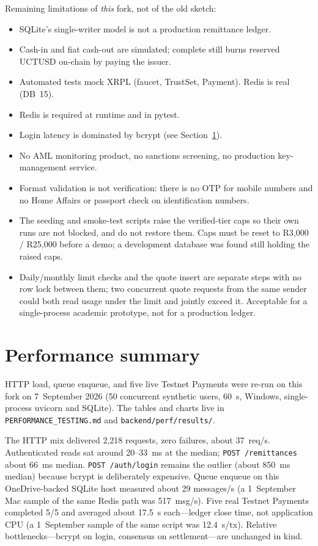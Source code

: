\documentclass[11pt]{article}
\begin{document}
Remaining limitations of \emph{this} fork, not of the old sketch:
\begin{itemize}
  \item SQLite's single-writer model is not a production remittance ledger.
  \item Cash-in and fiat cash-out are simulated; complete still burns reserved UCTUSD on-chain by paying the issuer.
  \item Automated tests mock XRPL (faucet, TrustSet, Payment). Redis is real (DB~15).
  \item Redis is required at runtime and in pytest.
  \item Login latency is dominated by bcrypt (see Section~\ref{sec:perf}).
  \item No AML monitoring product, no sanctions screening, no production key-management service.
  \item Format validation is not verification: there is no OTP for mobile numbers and no Home Affairs or passport check on identification numbers.
  \item The seeding and smoke-test scripts raise the verified-tier caps so their own runs are not blocked, and do not restore them. Caps must be reset to R3{,}000 / R25{,}000 before a demo; a development database was found still holding the raised caps.
  \item Daily/monthly limit checks and the quote insert are separate steps with no row lock between them; two concurrent quote requests from the same sender could both read usage under the limit and jointly exceed it. Acceptable for a single-process academic prototype, not for a production ledger.
\end{itemize}

\section{Performance summary}
\label{sec:perf}
HTTP load, queue enqueue, and five live Testnet Payments were re-run on this fork on 7~September 2026 (50 concurrent synthetic users, 60~s, Windows, single-process uvicorn and SQLite). The tables and charts live in \texttt{PERFORMANCE\_TESTING.md} and \texttt{backend/perf/results/}.

The HTTP mix delivered 2{,}218 requests, zero failures, about 37~req/s. Authenticated reads sat around 20--33~ms at the median; \texttt{POST /remittances} about 66~ms median. \texttt{POST /auth/login} remains the outlier (about 850~ms median) because bcrypt is deliberately expensive. Queue enqueue on this OneDrive-backed SQLite host measured about 29 messages/s (a 1~September Mac sample of the same Redis path was 517~msg/s). Five real Testnet Payments completed 5/5 and averaged about 17.5~s each---ledger close time, not application CPU (a 1~September sample of the same script was 12.4~s/tx). Relative bottlenecks---bcrypt on login, consensus on settlement---are unchanged in kind.
\end{document}
